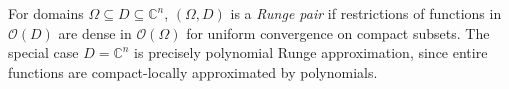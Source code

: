 
For domains $\Omega\subseteq D\subseteq\mathbb C^n$, $(\Omega,D)$ is a \emph{Runge pair} if restrictions of functions in $\mathcal O(D)$ are dense in $\mathcal O(\Omega)$ for uniform convergence on compact subsets. The special case $D=\mathbb C^n$ is precisely polynomial Runge approximation, since entire functions are compact-locally approximated by polynomials.
